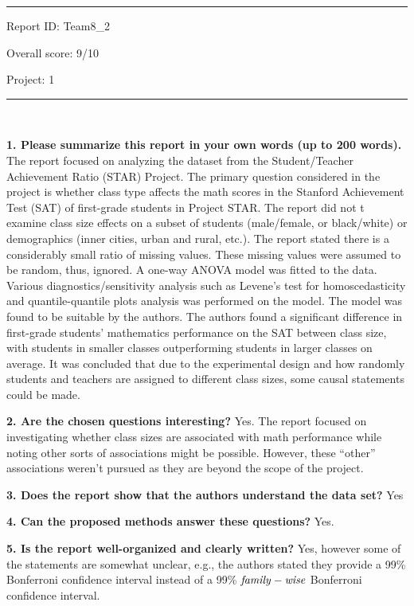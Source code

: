 \documentclass[]{article}
\title{}
\author{}
\date{}
\begin{document}
\begin{center}\rule{0.5\linewidth}{\linethickness}\end{center}

Report ID: Team8\_2

Overall score: 9/10

Project: 1

\begin{center}\rule{0.5\linewidth}{\linethickness}\end{center}

~

\textbf{1. Please summarize this report in your own words (up to 200
words).} The report focused on analyzing the dataset from the
Student/Teacher Achievement Ratio (STAR) Project. The primary question
considered in the project is whether class type affects the math scores
in the Stanford Achievement Test (SAT) of first-grade students in
Project STAR. The report did not t examine class size effects on a
subset of students (male/female, or black/white) or demographics (inner
cities, urban and rural, etc.). The report stated there is a
considerably small ratio of missing values. These missing values were
assumed to be random, thus, ignored. A one-way ANOVA model was fitted to
the data. Various diagnostics/sensitivity analysis such as Levene's test
for homoscedasticity and quantile-quantile plots analysis was performed
on the model. The model was found to be suitable by the authors. The
authors found a significant difference in first-grade students'
mathematics performance on the SAT between class size, with students in
smaller classes outperforming students in larger classes on average. It
was concluded that due to the experimental design and how randomly
students and teachers are assigned to different class sizes, some causal
statements could be made.

\textbf{2. Are the chosen questions interesting?} Yes. The report
focused on investigating whether class sizes are associated with math
performance while noting other sorts of associations might be possible.
However, these ``other'' associations weren't pursued as they are beyond
the scope of the project.

\textbf{3. Does the report show that the authors understand the data
set?} Yes

\textbf{4. Can the proposed methods answer these questions?} Yes.

\textbf{5. Is the report well-organized and clearly written?} Yes,
however some of the statements are somewhat unclear, e.g., the authors
stated they provide a 99\% Bonferroni confidence interval instead of a
99\% \(\it{family-wise}\) Bonferroni confidence interval.
\end{document}
